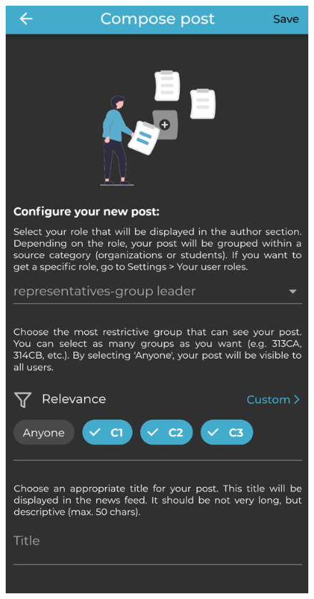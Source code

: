 \begin{figure}[!ht]
\begin{minipage}[b]{0.32\textwidth}
        \label{4:fig:user_no_permissions}
    \end{minipage}
    \hfill
    \begin{minipage}[b]{0.32\textwidth}
        \captionsetup{justification=centering}
        \includegraphics[width=\textwidth]{figures/app/final/compose-post-completion-1-final.png}

\end{minipage}
\end{figure}

